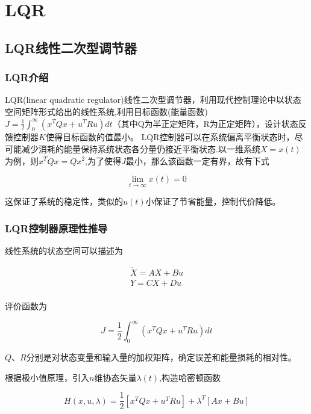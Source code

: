 \chapter{LQR}
\section{LQR线性二次型调节器}

\subsection{LQR介绍}

LQR(linear quadratic regulator)线性二次型调节器，利用现代控制理论中以状态空间矩阵形式给出的线性系统,利用目标函数(能量函数)$J=\frac{1}{2}\int_0^\infty(x^TQx+u^TRu)dt$（其中Q为半正定矩阵，R为正定矩阵），设计状态反馈控制器$K$使得目标函数的值最小。
LQR控制器可以在系统偏离平衡状态时，尽可能减少消耗的能量保持系统状态各分量仍接近平衡状态.以一维系统$X=x(t)$为例，则$x^TQx=Qx^2$,为了使得$J$最小，那么该函数一定有界，故有下式

\begin{equation}
\lim_{t \rightarrow \infty}x(t)=0
\end{equation}

这保证了系统的稳定性，类似的$u(t)$小保证了节省能量，控制代价降低。

\subsection{LQR控制器原理性推导}

线性系统的状态空间可以描述为
	
\begin{equation}
\begin{aligned}
\dot X=AX+Bu\\
Y=CX+Du\\
\end{aligned}
\end{equation}

评价函数为

\begin{equation}
J=\frac{1}{2}\int_0^\infty(x^TQx+u^TRu)dt
\end{equation}

$Q、R$分别是对状态变量和输入量的加权矩阵，确定误差和能量损耗的相对性。

根据极小值原理，引入$n$维协态矢量$\lambda(t)$,构造哈密顿函数

\begin{equation}
H(x,u,\lambda)=\frac{1}{2}[x^TQx+u^TRu]+\lambda^T[Ax+Bu]
\end{equation}

